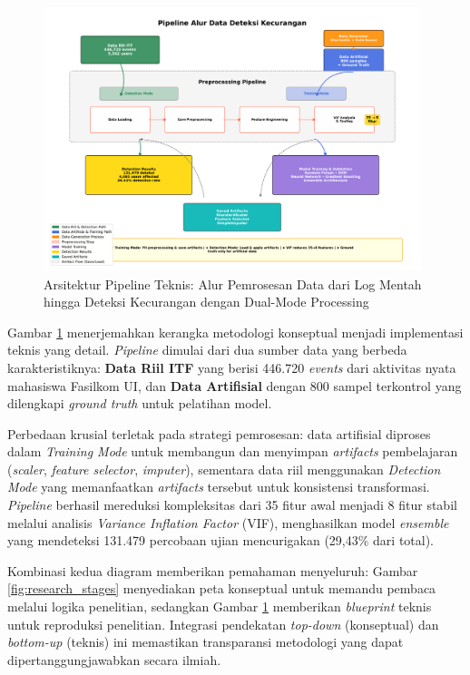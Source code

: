 \begin{figure}[htbp]
    \centering
    \includegraphics[width=0.98\textwidth]{newfigures/technical_pipeline_flow_final.pdf}
    \caption{Arsitektur Pipeline Teknis: Alur Pemrosesan Data dari Log Mentah hingga Deteksi Kecurangan dengan Dual-Mode Processing}
    \label{fig:technical_pipeline}
\end{figure}

Gambar \ref{fig:technical_pipeline} menerjemahkan kerangka metodologi konseptual menjadi implementasi teknis yang detail. \textit{Pipeline} dimulai dari dua sumber data yang berbeda karakteristiknya: \textbf{Data Riil ITF} yang berisi 446.720 \textit{events} dari aktivitas nyata mahasiswa Fasilkom UI, dan \textbf{Data Artifisial} dengan 800 sampel terkontrol yang dilengkapi \textit{ground truth} untuk pelatihan model. 

Perbedaan krusial terletak pada strategi pemrosesan: data artifisial diproses dalam \textit{Training Mode} untuk membangun dan menyimpan \textit{artifacts} pembelajaran (\textit{scaler}, \textit{feature selector}, \textit{imputer}), sementara data riil menggunakan \textit{Detection Mode} yang memanfaatkan \textit{artifacts} tersebut untuk konsistensi transformasi. \textit{Pipeline} berhasil mereduksi kompleksitas dari 35 fitur awal menjadi 8 fitur stabil melalui analisis \textit{Variance Inflation Factor} (VIF), menghasilkan model \textit{ensemble} yang mendeteksi 131.479 percobaan ujian mencurigakan (29,43\% dari total).

Kombinasi kedua diagram memberikan pemahaman menyeluruh: Gambar \ref{fig:research_stages} menyediakan peta konseptual untuk memandu pembaca melalui logika penelitian, sedangkan Gambar \ref{fig:technical_pipeline} memberikan \textit{blueprint} teknis untuk reproduksi penelitian. Integrasi pendekatan \textit{top-down} (konseptual) dan \textit{bottom-up} (teknis) ini memastikan transparansi metodologi yang dapat dipertanggungjawabkan secara ilmiah.

